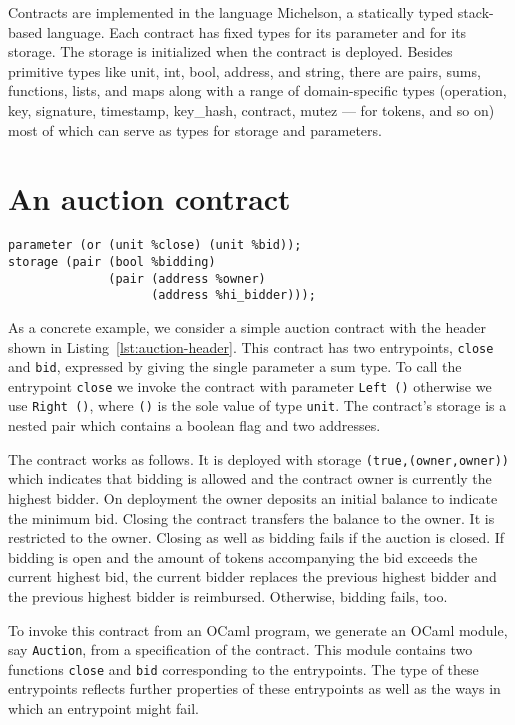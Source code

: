 \documentclass[a4paper,USenglish,american,cleveref, autoref, thm-restate]{oasics-v2021}
\begin{document}
Contracts are implemented in the language Michelson, a statically typed
stack-based language. Each contract has fixed types for its parameter
and for its storage. The storage is initialized when the contract is
deployed. Besides primitive types like unit, int, bool, address, and string,
there are pairs, sums, functions, lists, and maps along with a range
of domain-specific types (operation, key, signature, timestamp,
key\_hash, contract, mutez --- for tokens, and so on) most of which
can serve as types for storage and parameters.

\section{An auction contract}
\label{sec:an-auction-contract}
\begin{lstlisting}[float,caption={Simple auction contract (auction.tz)},captionpos=b,label={lst:auction-header},language=michelson,numbers=none,emph={close,bid,bidding,owner,hi_bidder},emphstyle=\underbar]
parameter (or (unit %close) (unit %bid));
storage (pair (bool %bidding)
              (pair (address %owner)
                    (address %hi_bidder)));
\end{lstlisting}

As a concrete example, we consider a simple auction contract with the
header shown in Listing~\ref{lst:auction-header}. 
This contract has two entrypoints, \lstinline/close/ and \lstinline/bid/,
expressed by giving the single parameter a sum type. To call the
entrypoint \lstinline/close/ we invoke the contract with parameter \lstinline/Left ()/
otherwise we use \lstinline/Right ()/, where \lstinline/()/ is the sole
value of type \lstinline/unit/. The contract's storage is a nested pair which
contains a boolean flag and two addresses.

The contract works as follows. It is deployed with storage
\lstinline/(true,(owner,owner))/ which indicates that bidding is
allowed and the contract owner is currently the highest
bidder. On deployment the owner deposits an initial balance to indicate the
minimum bid. Closing the contract transfers the balance to the
owner. It is restricted to the owner. Closing as well as bidding fails
if the auction is
closed. If bidding is open and the amount of tokens accompanying the bid exceeds the
current highest bid, the current bidder replaces the previous highest
bidder and the previous highest bidder is reimbursed. Otherwise,
bidding fails, too.

To invoke this contract from an OCaml program, we generate an
OCaml module, say \lstinline/Auction/, from a specification of the
contract. This module contains two functions
\lstinline/close/ and \lstinline/bid/ corresponding to the
entrypoints. The type of these entrypoints reflects further properties
of these entrypoints as well as the ways in which an entrypoint might
fail.
\end{document}
